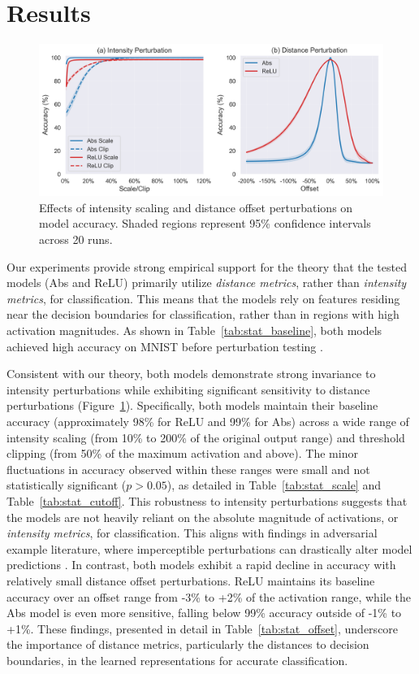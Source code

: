 \section{Results}

\begin{figure}[ht]
 \centering
 \includegraphics[width=\textwidth]{images/perturbation_analysis}
 \caption{Effects of intensity scaling and distance offset perturbations on model accuracy. Shaded regions represent 95\% confidence intervals across 20 runs.}
 \label{fig:perturbation_analysis}
\end{figure}

Our experiments provide strong empirical support for the theory that the tested models (Abs and ReLU) primarily utilize \emph{distance metrics}, rather than \emph{intensity metrics}, for classification. This means that the models rely on features residing near the decision boundaries for classification, rather than in regions with high activation magnitudes. As shown in Table~\ref{tab:stat_baseline}, both models achieved high accuracy on MNIST before perturbation testing \citep{lecun1998gradient}.

Consistent with our theory, both models demonstrate strong invariance to intensity perturbations while exhibiting significant sensitivity to distance perturbations (Figure~\ref{fig:perturbation_analysis}). Specifically, both models maintain their baseline accuracy (approximately 98\% for ReLU and 99\% for Abs) across a wide range of intensity scaling (from 10\% to 200\% of the original output range) and threshold clipping (from 50\% of the maximum activation and above). The minor fluctuations in accuracy observed within these ranges were small and not statistically significant ($p > 0.05$), as detailed in Table~\ref{tab:stat_scale} and Table~\ref{tab:stat_cutoff}. This robustness to intensity perturbations suggests that the models are not heavily reliant on the absolute magnitude of activations, or \emph{intensity metrics}, for classification. This aligns with findings in adversarial example literature, where imperceptible perturbations can drastically alter model predictions \citep{szegedy2013intriguing,goodfellow2014explaining}.
In contrast, both models exhibit a rapid decline in accuracy with relatively small distance offset perturbations. ReLU maintains its baseline accuracy over an offset range from -3\% to +2\% of the activation range, while the Abs model is even more sensitive, falling below 99\% accuracy outside of -1\% to +1\%. These findings, presented in detail in Table~\ref{tab:stat_offset}, underscore the importance of distance metrics, particularly the distances to decision boundaries, in the learned representations for accurate classification.

